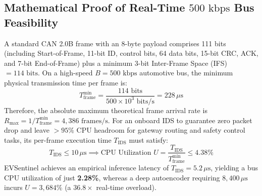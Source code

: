 \documentclass[conference]{IEEEtran}
\begin{document}
\subsection{Mathematical Proof of Real-Time $500\text{ kbps}$ Bus Feasibility}
A standard CAN 2.0B frame with an 8-byte payload comprises 111 bits (including Start-of-Frame, 11-bit ID, control bits, 64 data bits, 15-bit CRC, ACK, and 7-bit End-of-Frame) plus a minimum 3-bit Inter-Frame Space (IFS) $= 114\text{ bits}$. On a high-speed $B = 500\text{ kbps}$ automotive bus, the minimum physical transmission time per frame is:
\begin{equation}
    T_{\text{frame}}^{\min} = \frac{114\text{ bits}}{500 \times 10^3\text{ bits/s}} = 228\,\mu\text{s}
\end{equation}
Therefore, the absolute maximum theoretical frame arrival rate is $R_{\max} = 1 / T_{\text{frame}}^{\min} = 4,386\text{ frames/s}$. For an onboard IDS to guarantee zero packet drop and leave $>95\%$ CPU headroom for gateway routing and safety control tasks, its per-frame execution time $T_{\text{IDS}}$ must satisfy:
\begin{equation}
    T_{\text{IDS}} \le 10\,\mu\text{s} \implies \text{CPU Utilization } U = \frac{T_{\text{IDS}}}{T_{\text{frame}}^{\min}} \le 4.38\%
\end{equation}
EVSentinel achieves an empirical inference latency of $T_{\text{IDS}} = 5.2\,\mu\text{s}$, yielding a bus CPU utilization of just \textbf{2.28\%}, whereas a deep autoencoder requiring $8,400\,\mu\text{s}$ \cite{zhang2022} incurs $U = 3,684\%$ (a $36.8\times$ real-time overload).

\end{document}
